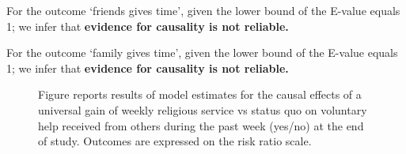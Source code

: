 \documentclass[
  single column]{article}
\begin{document}
For the outcome `friends gives time', given the lower bound of the
E-value equals 1; we infer that \textbf{evidence for causality is not
reliable.}

For the outcome `family gives time', given the lower bound of the
E-value equals 1; we infer that \textbf{evidence for causality is not
reliable.}

\newpage{}

\begin{figure}


\caption{\label{fig-3_2}Figure reports results of model estimates for
the causal effects of a universal gain of weekly religious service vs
status quo on voluntary help received from others during the past week
(yes/no) at the end of study. Outcomes are expressed on the risk ratio
scale.}

\end{figure}%
\end{document}
